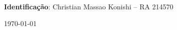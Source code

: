 \documentclass[11pt,letter]{article}
\begin{document}
	\begin{spacing}{1.3}
		\setcounter{page}{1}
		\noindent \textbf{Identificação}: Christian Massao Konishi -- RA 214570\\
		
		\vspace*{\fill}
		
		\centerline{\today}
		
		\newpage
		
		
		
		
		
		
	\end{spacing}
	
	\vfill
	
\end{document}
